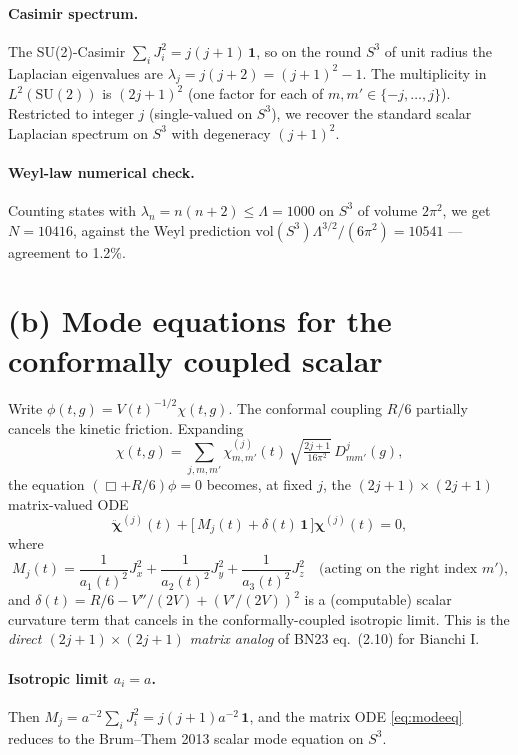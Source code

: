 \documentclass[11pt,a4paper]{article}
\theoremstyle{definition}
\begin{document}
\paragraph{Casimir spectrum.} The SU(2)-Casimir
$\sum_i J_i^2 = j(j+1)\,\mathbf 1$, so on the round $S^3$ of unit radius
the Laplacian eigenvalues are $\lambda_j = j(j+2) = (j+1)^2-1$. The
multiplicity in $L^2(\mathrm{SU}(2))$ is $(2j+1)^2$ (one factor for each
of $m,m'\in\{-j,\dots,j\}$). Restricted to integer $j$ (single-valued on
$S^3$), we recover the standard scalar Laplacian spectrum on $S^3$
with degeneracy $(j+1)^2$.

\paragraph{Weyl-law numerical check.} Counting states with
$\lambda_n = n(n+2) \le \Lambda=1000$ on $S^3$ of volume $2\pi^2$, we get
$N=10416$, against the Weyl prediction
$\mathrm{vol}(S^3)\Lambda^{3/2}/(6\pi^2) = 10541$ --- agreement to 1.2\%.

\section{(b) Mode equations for the conformally coupled scalar}

Write $\phi(t,g) = V(t)^{-1/2} \chi(t,g)$. The conformal coupling
$R/6$ partially cancels the kinetic friction. Expanding
\[
  \chi(t,g) = \sum_{j,m,m'} \chi^{(j)}_{m,m'}(t)\,\sqrt{\tfrac{2j+1}{16\pi^2}}\,
  D^j_{m m'}(g),
\]
the equation $(\Box + R/6)\phi = 0$ becomes, at fixed $j$, the
$(2j+1)\times(2j+1)$ matrix-valued ODE
\begin{equation}\label{eq:modeeq}
  \ddot{\boldsymbol\chi}^{(j)}(t) + \big[\,M_j(t) + \delta(t)\,\mathbf 1\,\big]
    \boldsymbol\chi^{(j)}(t) = 0,
\end{equation}
where
\[
  M_j(t) = \frac{1}{a_1(t)^2}J_x^2 + \frac{1}{a_2(t)^2}J_y^2
         + \frac{1}{a_3(t)^2}J_z^2 \quad
         \text{(acting on the right index $m'$),}
\]
and $\delta(t) = R/6 - V''/(2V) + (V'/(2V))^2$ is a (computable) scalar
curvature term that cancels in the conformally-coupled isotropic limit.
This is the \emph{direct $(2j+1)\times(2j+1)$ matrix analog} of BN23
eq.~(2.10) for Bianchi I.

\paragraph{Isotropic limit $a_i = a$.} Then
$M_j = a^{-2} \sum_i J_i^2 = j(j+1) a^{-2}\,\mathbf 1$, and the matrix
ODE \eqref{eq:modeeq} reduces to the Brum--Them 2013 scalar mode equation
on $S^3$.
\end{document}
